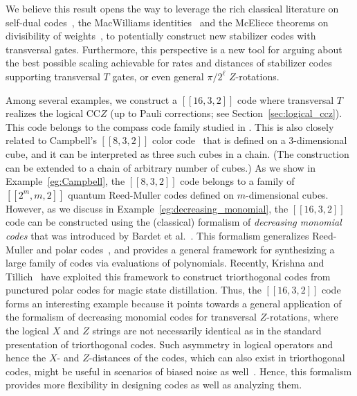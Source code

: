 \documentclass[twoside,romanappendices]{IEEEtran}
\newcommand{\red}[1]{{\color{red}#1}}
\newcommand{\llbr}{[\![}
\newcommand{\rrbr}{]\!]}
\begin{document}
We believe this result opens the way to leverage the rich classical literature on self-dual codes~\cite{Rains-arxiv02,Nebe-2006}, the MacWilliams identities~\cite{Macwilliams-1977} and the McEliece theorems on divisibility of weights~\cite{McEliece-jpl72,McEliece-dm72}, to potentially construct new stabilizer codes with transversal gates. 
Furthermore, this perspective is a new tool for arguing about the best possible scaling achievable for rates and distances of stabilizer codes supporting transversal $T$ gates, or even general $\pi/2^{\ell}$ $Z$-rotations. %

Among several examples, we construct a $\llbr 16,3,2 \rrbr$ code where transversal $T$ realizes the logical CC$Z$ (up to Pauli corrections; see Section~\ref{sec:logical_ccz}). 
This code belongs to the compass code family studied in \cite{Li-prx19}.
This is also closely related to Campbell's $\llbr 8,3,2 \rrbr$ color code~\cite{Campbell-blog16} that is defined on a $3$-dimensional cube, and it can be interpreted as three such cubes in a chain.
(The construction can be extended to a chain of arbitrary number of cubes.)
As we show in Example~\ref{eg:Campbell}, the $\llbr 8,3,2 \rrbr$ code belongs to a family of $\llbr 2^m,m,2 \rrbr$ quantum Reed-Muller codes defined on $m$-dimensional cubes.
However, as we discuss in Example~\ref{eg:decreasing_monomial}, the $\llbr 16,3,2 \rrbr$ code can be constructed using the (classical) formalism of \emph{decreasing monomial codes} that was introduced by Bardet et al.~\cite{Bardet-isit16,Bardet-arxiv16}.
This formalism generalizes Reed-Muller and polar codes~\cite{Arikan-it09}, and provides a general framework for synthesizing a large family of codes via evaluations of polynomials.
Recently, Krishna and Tillich~\cite{Krishna-arxiv18} have exploited this framework to construct triorthogonal codes from punctured polar codes for magic state distillation.
Thus, the $\llbr 16,3,2 \rrbr$ code forms an interesting example because it points towards a general application of the formalism of decreasing monomial codes for transversal $Z$-rotations, where the logical $X$ and $Z$ strings are not necessarily identical as in the standard presentation of triorthogonal codes.
Such asymmetry in logical operators and hence the $X$- and $Z$-distances of the codes, which can also exist in triorthogonal codes, might be useful in scenarios of biased noise as well~\cite{Tuckett-prl18}. 
Hence, this formalism provides more flexibility in designing codes as well as analyzing them.
\end{document}
